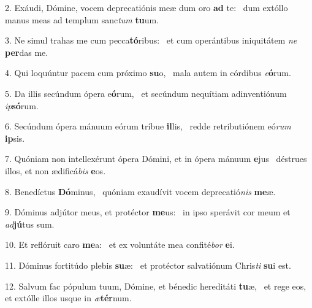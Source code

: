 2. Exáudi, Dómine, vocem deprecatiónis meæ dum oro \textbf{ad} te: \ast\  dum extóllo manus meas ad templum sanc\textit{tum} \textbf{tu}um.\

3. Ne simul trahas me cum pecca\textbf{tó}ribus: \ast\  et cum operántibus iniquitátem \textit{ne} \textbf{per}das me.\

4. Qui loquúntur pacem cum próximo \textbf{su}o, \ast\  mala autem in córdibus \textit{e}\textbf{ó}rum.\

5. Da illis secúndum ópera e\textbf{ó}rum, \ast\  et secúndum nequítiam adinventiónum \textit{ip}\textbf{só}rum.\

6. Secúndum ópera mánuum eórum tríbue \textbf{il}lis, \ast\  redde retributiónem eó\textit{rum} \textbf{ip}sis.\

7. Quóniam non intellexérunt ópera Dómini, et in ópera mánuum \textbf{e}jus \ast\  déstrues illos, et non ædificá\textit{bis} \textbf{e}os.\

8. Benedíctus \textbf{Dó}minus, \ast\  quóniam exaudívit vocem deprecatió\textit{nis} \textbf{me}æ.\

9. Dóminus adjútor meus, et protéctor \textbf{me}us: \ast\  in ipso sperávit cor meum et \textit{ad}\textbf{jú}tus sum.\

10. Et reflóruit caro \textbf{me}a: \ast\  et ex voluntáte mea confité\textit{bor} \textbf{e}i.\

11. Dóminus fortitúdo plebis \textbf{su}æ: \ast\  et protéctor salvatiónum Chris\textit{ti} \textbf{su}i est.\

12. Salvum fac pópulum tuum, Dómine, et bénedic hereditáti \textbf{tu}æ, \ast\  et rege eos, et extólle illos usque in \textit{æ}\textbf{tér}num.\

